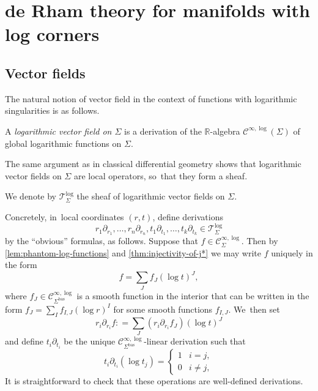 \documentclass[10pt]{amsart}
\theoremstyle{definition}
\theoremstyle{remark}
\let\defn\emph
\newcommand{\RR}{\mathbb{R}}
\newcommand{\defas}{\mathrel{\mathop:}=}
\newcommand{\Cinflog}[1]{\mathscr{C}^{\infty,\log}_{#1}}
\newcommand{\VFlog}[1]{\mathcal{T}^{\log}_{#1}}
\newcommand{\logcvf}[1]{#1\partial_{#1}}
\newcommand{\Sig}{\Sigma}
\newcommand{\bas}[1]{{#1}^{\mathrm{bas}}}
\newcommand{\Sigbas}{\bas{\Sig}}
\begin{document}
\section{de Rham theory for manifolds with log corners}

\subsection{Vector fields}\label{sec:vector-fields}

The natural notion of vector field in the context of functions with logarithmic singularities is as follows.
\begin{definition} A \defn{logarithmic vector field on $\Sig$} is a derivation of the $\RR$-algebra $\Cinflog{}(\Sig)$ of global logarithmic functions on $\Sig$.
\end{definition}

The same argument as in classical differential geometry shows that logarithmic vector fields on $\Sig$ are local operators, so~that they form a sheaf.

\begin{definition}
We denote by $\VFlog{\Sig}$ the sheaf of logarithmic vector fields on $\Sig$.
\end{definition}

Concretely, in~local coordinates $(r,t)$, define derivations\vspace*{-3pt}
\begin{equation}
\logcvf{r_1},\ldots,\logcvf{r_n}, \logcvf{t_1},\ldots,\logcvf{t_k}\in \VFlog{\Sig} \label{eq:coord-vfs}
\end{equation}
by the ``obvious'' formulas, as follows. Suppose that $f \in \Cinflog{\Sig}$. Then by \autoref{lem:phantom-log-functions} and \autoref{thm:injectivity-of-j*} we may write $f$ uniquely in the form\vspace*{-1pt}
\[
f = \sum_J f_J (\log t)^J,
\]
where $f_J \in \Cinflog{\Sigbas}$ is a smooth function in the interior that
can be written in the form $f_J = \sum_I f_{I,J} (\log r)^I$ for some smooth functions $f_{I,J}$. We~then set\vspace*{-3pt}
\[
\logcvf{r_i} f \defas \sum_J (\logcvf{r_i} f_J) (\log t)^J
\]
and define $\logcvf{t_i}$ be the unique $\Cinflog{\Sigbas}$-linear derivation such that\vspace*{-3pt}
\[
\logcvf{t_i} (\log t_j) = \begin{cases}
1 & i=j, \\
0 & i \neq j,
\end{cases}
\]
It is straightforward to check that these operations are well-defined derivations.
\end{document}
